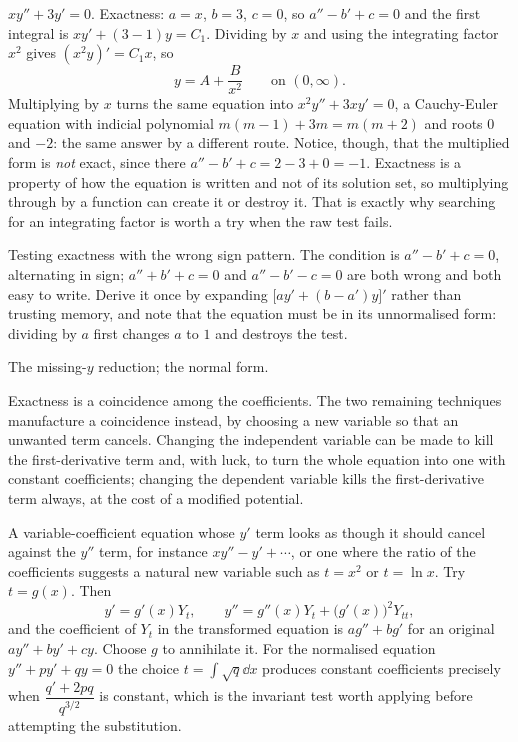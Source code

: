 \begin{worked}
$xy''+3y'=0$. Exactness: $a=x$, $b=3$, $c=0$, so $a''-b'+c=0$ and the first integral is $xy'+(3-1)y=C_1$. Dividing by $x$ and using the integrating factor $x^{2}$ gives $(x^{2}y)'=C_1x$, so
\[y=A+\frac{B}{x^{2}}\qquad\text{on }(0,\infty).\]
Multiplying by $x$ turns the same equation into $x^{2}y''+3xy'=0$, a Cauchy-Euler equation with indicial polynomial $m(m-1)+3m=m(m+2)$ and roots $0$ and $-2$: the same answer by a different route. Notice, though, that the multiplied form is \emph{not} exact, since there $a''-b'+c=2-3+0=-1$. Exactness is a property of how the equation is written and not of its solution set, so multiplying through by a function can create it or destroy it. That is exactly why searching for an integrating factor is worth a try when the raw test fails.
\end{worked}

\begin{trap}
Testing exactness with the wrong sign pattern. The condition is $a''-b'+c=0$, alternating in sign; $a''+b'+c=0$ and $a''-b'-c=0$ are both wrong and both easy to write. Derive it once by expanding $\bigl[ay'+(b-a')y\bigr]'$ rather than trusting memory, and note that the equation must be in its unnormalised form: dividing by $a$ first changes $a$ to $1$ and destroys the test.
\end{trap}

\begin{seealsob}The missing-$y$ reduction; the normal form.\end{seealsob}

Exactness is a coincidence among the coefficients. The two remaining techniques manufacture a coincidence instead, by choosing a new variable so that an unwanted term cancels. Changing the independent variable can be made to kill the first-derivative term and, with luck, to turn the whole equation into one with constant coefficients; changing the dependent variable kills the first-derivative term always, at the cost of a modified potential.

\cue A variable-coefficient equation whose $y'$ term looks as though it should cancel against the $y''$ term, for instance $xy''-y'+\cdots$, or one where the ratio of the coefficients suggests a natural new variable such as $t=x^{2}$ or $t=\ln x$.
\method Try $t=g(x)$. Then
\[y'=g'(x)Y_t,\qquad y''=g''(x)Y_t+\bigl(g'(x)\bigr)^{2}Y_{tt},\]
and the coefficient of $Y_t$ in the transformed equation is $ag''+bg'$ for an original $ay''+by'+cy$. Choose $g$ to annihilate it. For the normalised equation $y''+py'+qy=0$ the choice $t=\int\sqrt{q}\dd x$ produces constant coefficients precisely when $\dfrac{q'+2pq}{q^{3/2}}$ is constant, which is the invariant test worth applying before attempting the substitution.

